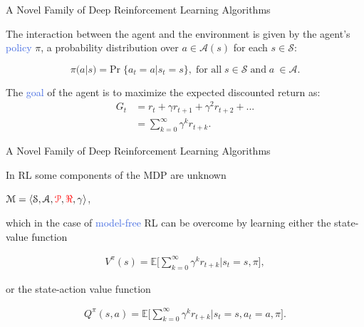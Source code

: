 \documentclass{beamer}
\begin{document}
\begin{frame}{A Novel Family of Deep Reinforcement Learning Algorithms}
	
	\bigskip

	The interaction between the agent and the environment is given by the agent's \textcolor{RoyalBlue}{policy} $\pi$, a probability distribution over $a \in \mathcal{A}(s)$ for each $s \in \mathcal{S}$:

	\begin{equation*}
	\pi(a|s) = \text{Pr}\; \{a_t = a | s_t = s\}, \; \text{for all}\; s \in \mathcal{S}\; \text{and}\; a\ \in \mathcal{A}.
	\end{equation*}

	\bigskip

	The \textcolor{RoyalBlue}{goal} of the agent is to maximize the expected discounted return as:
	\begin{equation*}
		\begin{split}
			G_t & = r_t+\gamma r_{t+1} + \gamma^{2} r_{t+2} + ... \\
	    			& = \sum_{k=0}^{\infty}\gamma^{k} r_{t+k}.
		\end{split}
		\label{eq:discounted_return}
	\end{equation*}

\end{frame}


\begin{frame}{A Novel Family of Deep Reinforcement Learning Algorithms}
	
	\bigskip
	In RL some components of the MDP are unknown 
	\begin{center}
		$\mathcal{M}=\langle\mathcal{S}, \mathcal{A}, \textcolor{red}{\mathcal{P}}, \textcolor{red}{\Re}, \gamma\rangle$,
	\end{center}
	
	which in the case of \textcolor{RoyalBlue}{model-free} RL can be overcome by learning either the state-value function

	\begin{align*}
    		V^{\pi}(s)=\mathds{E}\bigg[\sum_{k=0}^{\infty}\gamma^{k}r_{t+k}\bigg| s_t = s, \pi \bigg],
	\end{align*}

	or the state-action value function

	\begin{align*}
     		Q^{\pi}(s,a)=\mathds{E}\bigg[\sum_{k=0}^{\infty}\gamma^{k}r_{t+k} \bigg| s_t = s, a_t=a, \pi\bigg].
	\end{align*}
\end{frame}
\end{document}
